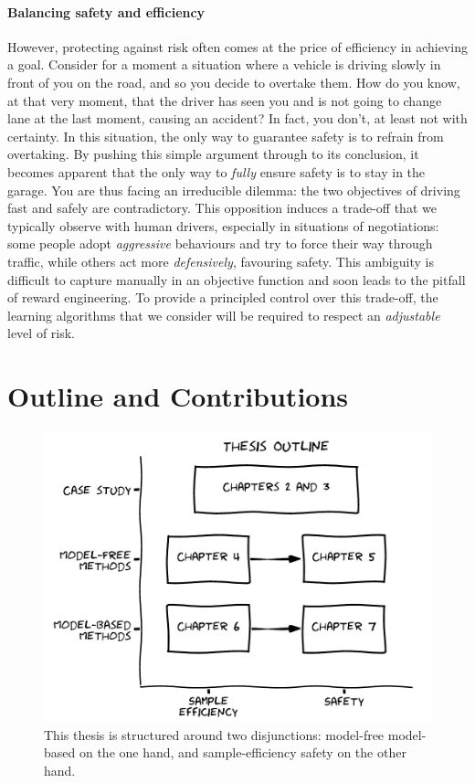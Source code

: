 \paragraph{Balancing safety and efficiency}
However, protecting against risk often comes at the price of efficiency in achieving a goal.
Consider for a moment a situation where a vehicle is driving slowly in front of you on the road, and so you decide to overtake them. How do you know, at that very moment, that the driver has seen you and is not going to change lane at the last moment, causing an accident? In fact, you don't, at least not with certainty. In this situation, the only way to guarantee safety is to refrain from overtaking. By pushing this simple argument through to its conclusion, it becomes apparent that the only way to \emph{fully} ensure safety is to stay in the garage.
You are thus facing an irreducible dilemma: the two objectives of driving fast and safely are contradictory.
This opposition induces a trade-off that we typically observe with human drivers, especially in situations of negotiations: some people adopt \emph{aggressive} behaviours and try to force their way through traffic, while others act more \emph{defensively}, favouring safety. This ambiguity is difficult to capture manually in an objective function and soon leads to the pitfall of reward engineering. To provide a principled control over this trade-off, the learning algorithms that we consider will be required to respect an \emph{adjustable} level of risk.

\section{Outline and Contributions}

\begin{figure}[ht]
	\includegraphics[width=0.9\linewidth]{img/outline}
	\caption{This thesis is structured around two disjunctions: model-free \vs model-based on the one hand, and sample-efficiency \vs safety on the other hand.}
	\label{fig:thesis-outline}
\end{figure}

